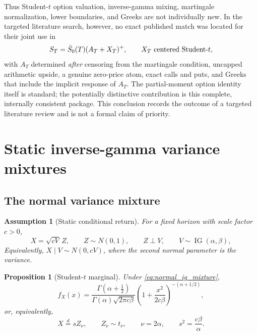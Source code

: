 \documentclass[11pt,a4paper]{article}
\newtheorem{proposition}{Proposition}[section]
\newtheorem{assumption}{Assumption}[section]
\DeclareMathOperator{\IG}{IG}
\begin{document}
Thus Student-$t$ option valuation, inverse-gamma mixing, martingale
normalization, lower boundaries, and Greeks are not individually new.  In the
targeted literature search, however, no exact published match was located for
their joint use in
\begin{equation}
  S_T=\bar S_0(T)(A_T+X_T)^+,
  \qquad X_T\ \hbox{centered Student-}t,
  \label{eq:literature_position_model}
\end{equation}
with $A_T$ determined \emph{after} censoring from the martingale condition,
uncapped arithmetic upside, a genuine zero-price atom, exact calls and puts,
and Greeks that include the implicit response of $A_T$.  The partial-moment
option identity itself is standard; the potentially distinctive contribution
is this complete, internally consistent package.  This conclusion records the
outcome of a targeted literature review and is not a formal claim of priority.

\section{Static inverse-gamma variance mixtures}

\subsection{The normal variance mixture}

\begin{assumption}[Static conditional return]
For a fixed horizon with scale factor $c>0$,
\begin{equation}
  X=\sqrt{cV}\,Z,\qquad Z\sim N(0,1),\qquad
  Z\perp V,\qquad V\sim\IG(\alpha,\beta),
  \label{eq:normal_ig_mixture}
\end{equation}
Equivalently, $X\mid V\sim N(0,cV)$, where the second normal parameter is
the variance.
\end{assumption}

\begin{proposition}[Student-$t$ marginal]
Under \eqref{eq:normal_ig_mixture},
\begin{equation}
  f_X(x)=
  \frac{\Gamma(\alpha+\tfrac12)}
       {\Gamma(\alpha)\sqrt{2\pi c\beta}}
  \left(1+\frac{x^2}{2c\beta}\right)^{-(\alpha+1/2)},
  \label{eq:mixture_density}
\end{equation}
or, equivalently,
\begin{equation}
  X\overset{d}{=}sZ_\nu,\qquad
  Z_\nu\sim t_\nu,\qquad
  \nu=2\alpha,\qquad
  s^2=\frac{c\beta}{\alpha}.
  \label{eq:student_mapping}
\end{equation}
\end{proposition}
\end{document}
